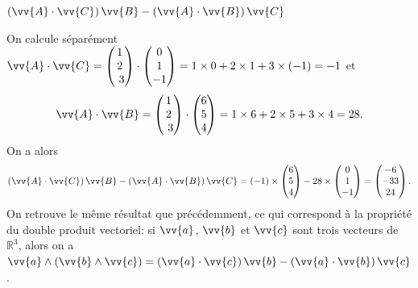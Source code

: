 


\begin{enonce}
$(\vv{A}\cdot\vv{C})\,\vv{B} - (\vv{A}\cdot\vv{B})\,\vv{C}$
\end{enonce}


\begin{corrige}
    On calcule séparément $\vv{A}\cdot\vv{C} = 
    \begin{pmatrix}1 \\ 2 \\ 3\end{pmatrix}\cdot
    \begin{pmatrix}0 \\ 1 \\-1\end{pmatrix}
    = 1\times 0 + 2\times 1 + 3\times(-1) = -1
    $ et 
    \[
    \vv{A}\cdot\vv{B} = 
    \begin{pmatrix}1 \\ 2 \\ 3\end{pmatrix}\cdot
    \begin{pmatrix}6 \\ 5 \\ 4\end{pmatrix}
    = 1\times6 + 2\times5 + 3\times4 = 28
    .
    \]
    On a alors
    \[
    (\vv{A}\cdot\vv{C})\,\vv{B} - (\vv{A}\cdot\vv{B})\,\vv{C}
    = (-1)\times \begin{pmatrix}6 \\ 5 \\ 4\end{pmatrix}
      - 28 \times \begin{pmatrix}0 \\ 1 \\-1\end{pmatrix}
    = \begin{pmatrix} -6 \\ -33 \\ 24\end{pmatrix}.\] 
    On retrouve le même résultat que précédemment, ce qui correspond à la propriété du double produit vectoriel: si $\vv{a}$, $\vv{b}$ et $\vv{c}$ sont trois vecteurs de $\mathbb{R}^3$, alors on a $\vv{a}\wedge(\vv{b}\wedge\vv{c}) = (\vv{a}\cdot\vv{c})\,\vv{b} - (\vv{a}\cdot\vv{b})\,\vv{c}$.
\end{corrige}

